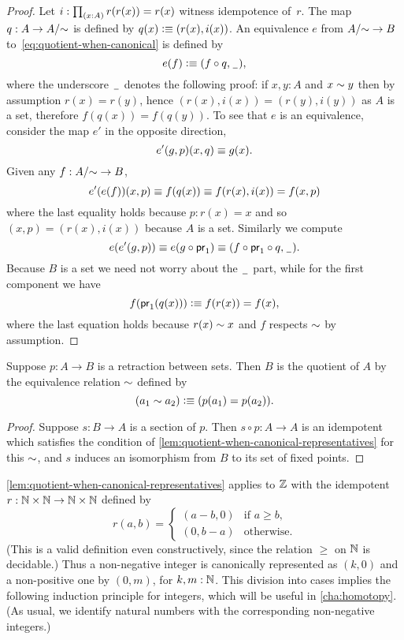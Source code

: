 \begin{proof}
  Let $i : \prd{x : A} r(r(x)) = r(x)$ witness idempotence of~$r$.
  The map $q : A \to A/{\sim}$ is defined by $q(x) \vcentcolon\equiv (r(x), i(x))$. An equivalence $e$
  from $A/{\sim} \to B$ to~\eqref{eq:quotient-when-canonical} is defined by
  \[ e(f) \vcentcolon\equiv (f \circ q, \mathord{\hspace{1pt}\underline{\hspace{1ex}}\hspace{1pt}}), \]
  where the underscore $\mathord{\hspace{1pt}\underline{\hspace{1ex}}\hspace{1pt}}$ denotes the following proof: if $x, y : A$ and $x \sim y$ then by assumption
  $r(x) = r(y)$, hence $(r(x), i(x)) = (r(y), i(y))$ as $A$ is a set, therefore $f(q(x)) =
  f(q(y))$. To see that $e$ is an equivalence, consider the map $e'$ in the opposite
  direction,
  \[ e'(g, p) (x, q) \equiv g(x). \]
  Given any $f : A/{\sim} \to B$,
  \[ e'(e(f))(x, p) \equiv f(q(x)) \equiv f(r(x), i(x)) = f(x, p) \]
  where the last equality holds because $p : r(x) = x$ and so $(x,p) = (r(x), i(x))$
  because $A$ is a set. Similarly we compute
  \[ e(e'(g, p)) \equiv e(g \circ \mathsf{pr}_{1}) \equiv (f \circ \mathsf{pr}_{1} \circ q, {\mathord{\hspace{1pt}\underline{\hspace{1ex}}\hspace{1pt}}}). \]
  Because $B$ is a set we need not worry about the $\mathord{\hspace{1pt}\underline{\hspace{1ex}}\hspace{1pt}}$ part, while for the first
  component we have
  \[ f(\mathsf{pr}_{1}(q(x))) \vcentcolon\equiv f(r(x)) = f(x), \]
  where the last equation holds because $r(x) \sim x$ and $f$ respects $\sim$ by
  assumption.
\end{proof}

\begin{cor}\label{thm:retraction-quotient}
  Suppose $p:A\to B$ is a retraction between sets.
  Then $B$ is the quotient of $A$ by the equivalence relation $\sim$ defined by
  \[ (a_1 \sim a_2) \vcentcolon\equiv (p(a_1) = p(a_2)). \]
\end{cor}
\begin{proof}
  Suppose $s:B\to A$ is a section of $p$.
  Then $s\circ p : A\to A$ is an idempotent which satisfies the condition of \autoref{lem:quotient-when-canonical-representatives} for this $\sim$, and $s$ induces an isomorphism from $B$ to its set of fixed points.
\end{proof}

\begin{rmk}\label{Z-quotient-by-canonical-representatives}
\autoref{lem:quotient-when-canonical-representatives} applies to $\mathbb{Z}$ with the idempotent $r : \mathbb{N} \times \mathbb{N} \to \mathbb{N} \times \mathbb{N}$
defined by
%
\begin{equation*}
  r(a, b) =
  \begin{cases}
    (a - b, 0) & \text{if $a \geq b$,} \\
    (0, b - a) & \text{otherwise.}
  \end{cases}  
\end{equation*}
%
(This is a valid definition even constructively, since the relation $\geq$ on $\mathbb{N}$ is decidable.)
Thus a non-negative integer is canonically represented as $(k, 0)$ and a non-positive one by $(0, m)$, for $k,m:\mathbb{N}$.
This division into cases implies the following induction principle for integers, which will be useful in \autoref{cha:homotopy}.
%
(As usual, we identify natural numbers with the corresponding non-negative integers.)
\end{rmk}


